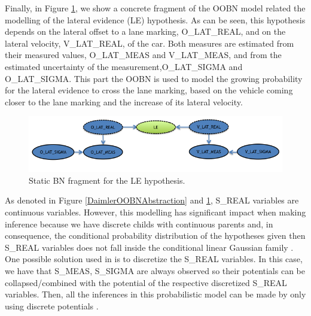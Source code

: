 Finally, in Figure \ref{Figure:DaimlerLE}, we show a concrete fragment of the OOBN model related the modelling of the lateral evidence (LE) hypothesis. As can be seen, this hypothesis depends on the lateral offset to a lane marking, O\_LAT\_REAL, and on the lateral velocity, V\_LAT\_REAL, of the car. Both measures are estimated from their measured values, O\_LAT\_MEAS and V\_LAT\_MEAS, and from the estimated uncertainty of the measurement,O\_LAT\_SIGMA and O\_LAT\_SIGMA. This part the OOBN is used to model the growing probability for the lateral evidence to cross the lane marking, based on the vehicle coming closer to the lane marking and the increase of its lateral velocity.

\begin{figure}
\begin{center}
\includegraphics[scale=0.58]{./figures/DaimlerLE}
\caption{\label{Figure:DaimlerLE} Static BN fragment for the LE hypothesis.}
\end{center}
\end{figure}


As denoted in Figure \ref{DaimlerOOBNAbstraction} and \ref{Figure:DaimlerLE}, S\_REAL variables are continuous variables. However, this modelling has significant impact when making inference because we have discrete childs with continuous parents and, in consequence, the conditional probability distribution of the hypotheses given then S\_REAL variables does not fall inside the conditional linear Gaussian family \cite{nielsen2009bayesian}. One possible solution used in  \cite{kasper2012object} is to discretize the S\_REAL variables. In this case, we have that S\_MEAS, S\_SIGMA are always observed so their potentials can be collapsed/combined with the potential of the respective  discretized S\_REAL variables. Then, all the inferences in this probabilistic model can be made by only using discrete potentials \cite{nielsen2009bayesian}.

